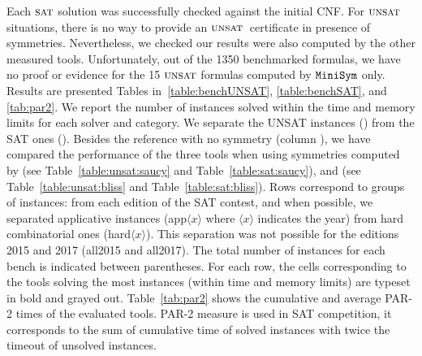 Each $\textsc{sat}$ solution was successfully checked against the initial CNF. For $\textsc{unsat}$
situations, there is no way to provide an $\textsc{unsat}\,$ certificate in presence of
symmetries. Nevertheless, we checked our results were also computed by the
other measured tools. Unfortunately, out of the 1350 benchmarked formulas, we
have no proof or evidence for the 15 $\textsc{unsat}$ formulas computed by $\texttt{MiniSym}{}$
only.
Results are presented Tables in~\ref{table:benchUNSAT}, \ref{table:benchSAT},
and \ref{tab:par2}. We report the number of instances solved within the time
and memory limits for each solver and category. We separate the UNSAT instances
() from the SAT ones (). Besides
the reference with no symmetry (column \minisat{}), we have compared the
performance of the three tools when using symmetries computed by \saucy{} (see
Table~\ref{table:unsat:saucy} and Table~\ref{table:sat:saucy}), and \bliss{}
(see Table~\ref{table:unsat:bliss} and Table~\ref{table:sat:bliss}). Rows
correspond to groups of instances: from each edition of the SAT contest, and
when possible, we separated applicative instances (app$\langle x \rangle$ where
$\langle x \rangle$ indicates the year) from hard combinatorial ones
(hard$\langle x \rangle$). This separation was not possible for the editions
2015 and 2017 (all2015 and all2017). The total number of instances for each
bench is indicated between parentheses. For each row, the cells corresponding
to the tools solving the most instances (within time and memory limits) are
typeset in bold and grayed out. Table~\ref{tab:par2} shows the cumulative and
average PAR-2 times of the evaluated tools. PAR-2 measure is used in SAT competition,
it corresponds to the sum of cumulative time of solved instances with twice the
timeout of unsolved instances.
 
